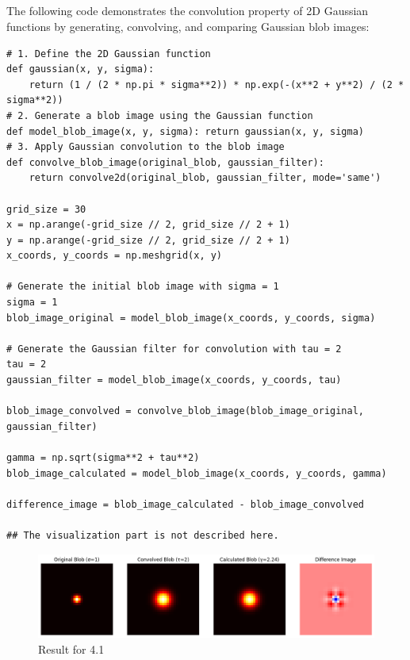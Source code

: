 \documentclass[12pt]{article}
\begin{document}
\subsection{}
The following code demonstrates the convolution property of 2D Gaussian functions by generating, convolving, and comparing Gaussian blob images:
\begin{lstlisting}[caption={Code for 4.1},captionpos=b]
# 1. Define the 2D Gaussian function
def gaussian(x, y, sigma):
    return (1 / (2 * np.pi * sigma**2)) * np.exp(-(x**2 + y**2) / (2 * sigma**2))
# 2. Generate a blob image using the Gaussian function
def model_blob_image(x, y, sigma): return gaussian(x, y, sigma)
# 3. Apply Gaussian convolution to the blob image
def convolve_blob_image(original_blob, gaussian_filter):
    return convolve2d(original_blob, gaussian_filter, mode='same')

grid_size = 30
x = np.arange(-grid_size // 2, grid_size // 2 + 1)
y = np.arange(-grid_size // 2, grid_size // 2 + 1)
x_coords, y_coords = np.meshgrid(x, y)

# Generate the initial blob image with sigma = 1
sigma = 1
blob_image_original = model_blob_image(x_coords, y_coords, sigma)

# Generate the Gaussian filter for convolution with tau = 2
tau = 2
gaussian_filter = model_blob_image(x_coords, y_coords, tau)

blob_image_convolved = convolve_blob_image(blob_image_original, gaussian_filter)

gamma = np.sqrt(sigma**2 + tau**2)
blob_image_calculated = model_blob_image(x_coords, y_coords, gamma)

difference_image = blob_image_calculated - blob_image_convolved

## The visualization part is not described here.

\end{lstlisting}

\FloatBarrier

\begin{figure}[ht]
    \centering
    \includegraphics[width=1.0\columnwidth, keepaspectratio]{pics/a5-4.1.png}
    \caption[]{Result for 4.1}
    \label{fig:4.1}
\end{figure}
\end{document}
